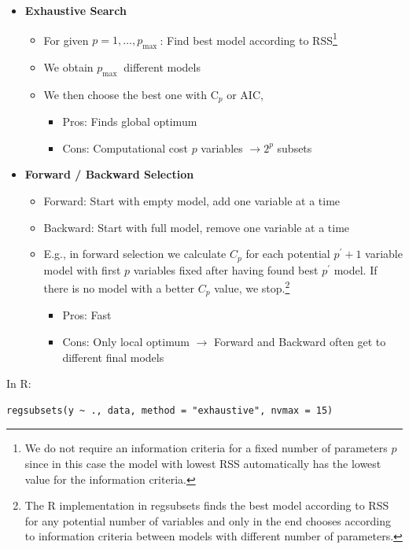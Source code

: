 \documentclass[11pt, %
	oneside, %
	english, %
	onehalfspacing, %
	]{article} %
\numberwithin{equation}{section}
\begin{document}
\begin{itemize}
	\item \textbf{Exhaustive Search}
	\begin{itemize}
		\item For given $p=1, \ldots, p_{\text {max }}$: Find best model according to RSS\footnote{We do not require an information criteria for a fixed number of parameters $p$ since in this case the model with lowest RSS automatically has the lowest value for the information criteria.}
		\item We obtain $p_{\text {max }}$ different models
		\item We then choose the best one with $\mathrm{C}_p$ or $\mathrm{AIC}$,
		\begin{itemize}
			\item Pros: Finds global optimum
			\item Cons: Computational cost $p$ variables $\rightarrow 2^p$ subsets
		\end{itemize}
	\end{itemize}
	\item \textbf{Forward / Backward Selection}
	\begin{itemize}
		\item Forward: Start with empty model, add one variable at a time
		\item Backward: Start with full model, remove one variable at a time
		\item E.g., in forward selection we calculate $C_p$ for each potential $p^\prime +1$ variable model with first $p$ variables fixed after having found best $p^\prime$ model. If there is no model with a better $C_p$ value, we stop.\footnote{The R implementation in regsubsets finds the best model according to RSS for any potential number of variables and only in the end chooses according to information criteria between models with different number of parameters.}
		\begin{itemize}
            \item Pros: Fast
		    \item Cons: Only local optimum $\rightarrow$ Forward and Backward often get to different final models
        \end{itemize}
	\end{itemize}
\end{itemize}

In R:

\begin{lstlisting}
regsubsets(y ~ ., data, method = "exhaustive", nvmax = 15)
\end{lstlisting}
\end{document}
